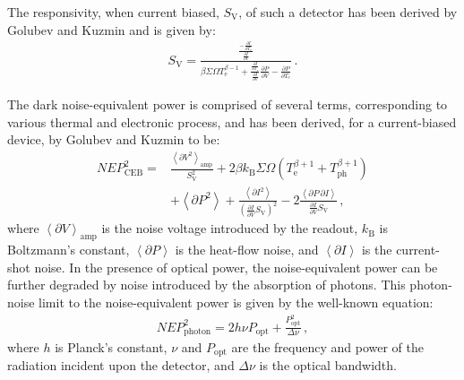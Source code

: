 \documentclass[final]{svjour2}
\begin{document}
\par 
The responsivity, when current biased, $S_{\mathrm{V}}$, of such a detector has been derived by Golubev and Kuzmin\cite{Golubev2001} and is given by:
\begin{align}
S_{\mathrm{V}} = \frac{\frac{-\frac{\partial I}
	{\partial T_{\mathrm{e}}}}{\frac{\partial I}{\partial V}}}
	{\beta\varSigma\varOmega T^{\beta-1}_{\mathrm{e}}
	+\frac{\frac{\partial I}{\partial T_{\mathrm{e}}}}
	{\frac{\partial I}{\partial V}}\frac{\partial P}{\partial V}
	-\frac{\partial P}{\partial T_{\mathrm{e}}}}\,. \label{eqn:responsivity}
\end{align}
\par 
The dark noise-equivalent power is comprised of several terms, corresponding to various thermal and electronic process, and has been derived, for a current-biased device, by Golubev and Kuzmin\cite{Golubev2001} to be:
\begin{align}
\mathit{NEP}^{2}_{\mathrm{CEB}} = 
	&\frac{\left<\partial V^{2}\right>_{\mathrm{amp}}}{S^{2}_{\mathrm{V}}}
	+ 2\beta k_{\mathrm{B}}\varSigma\varOmega
		\left(T^{\beta+1}_{\mathrm{e}}+T^{\beta+1}_{\mathrm{ph}}\right)\nonumber\\
	&+\left<\partial P^{2}\right>
	+ \frac{\left<\partial I^{2}\right>}
		{\left(\frac{\partial I}{\partial V}S_{\mathrm{V}}\right)^{2}}
	- 2\frac{\left<\partial P\, \partial I\right>}
		{\frac{\partial I}{\partial V}S_{\mathrm{V}}}\,, \label{eqn:darkNEP}
\end{align}
where $\left<\partial V\right>_{\mathrm{amp}}$ is the noise voltage introduced by the readout, $k_{\mathrm{B}}$ is Boltzmann's constant, $\left<\partial P\right>$ is the heat-flow noise, and $\left<\partial I\right>$ is the current-shot noise. In the presence of optical power, the noise-equivalent power can be further degraded by noise introduced by the absorption of photons. This photon-noise limit to the noise-equivalent power is given by the well-known equation:\cite{Zmuidzinas2003}
\begin{align}
\mathit{NEP}^{2}_{\mathrm{photon}} = 2h\nu P_{\mathrm{opt}} 
	+ \frac{P^{2}_{\mathrm{opt}}}{\Delta\nu}\,, \label{eqn:photonNEP}
\end{align}
where $h$ is Planck's constant, $\nu$ and $P_{\mathrm{opt}}$ are the frequency and power of the radiation incident upon the detector, and $\Delta\nu$ is the optical bandwidth.
%
\end{document}
